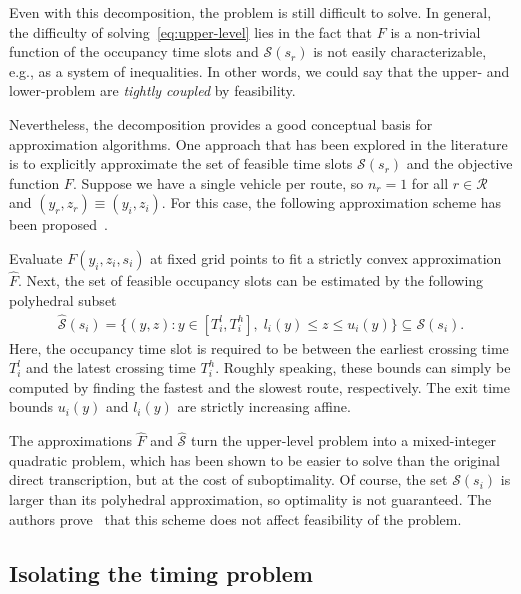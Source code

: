\documentclass[a4paper]{report}
\theoremstyle{definition}
\theoremstyle{plain}
\begin{document}
Even with this decomposition, the problem is still difficult to solve.
%
In general, the difficulty of solving~\eqref{eq:upper-level} lies in the fact that $F$ is a
non-trivial function of the occupancy time slots and $\mathcal{S}(s_{r})$ is not
easily characterizable, e.g., as a system of inequalities. In other words, we
could say that the upper- and lower-problem are \emph{tightly coupled} by
feasibility.

Nevertheless, the decomposition provides a good conceptual basis for
approximation algorithms.
%
One approach that has been explored in the literature is to explicitly
approximate the set of feasible time slots $\mathcal{S}(s_r)$ and the objective
function $F$.
%
Suppose we have a single vehicle per route, so $n_r = 1$ for all
$r \in \mathcal{R}$ and $(y_{r}, z_{r}) \equiv (y_{i},z_{i})$.
%
For this case, the following approximation scheme has been proposed~\cite{hultApproximateSolutionOptimal2015}. 

Evaluate $F(y_{i}, z_{i}, s_{i})$ at fixed grid points to fit a strictly convex approximation $\hat{F}$.
%
Next, the set of feasible occupancy slots can be estimated by the following
polyhedral subset
\begin{align}
  \hat{\mathcal{S}}(s_i) = \{ (y, z) : y \in [T_{i}^{l},T_{i}^{h}], \; l_{i}(y) \leq z \leq u_{i}(y) \} \subseteq \mathcal{S}(s_{i}) .
\end{align}
Here, the occupancy time slot is required to be between the earliest crossing time
$T_{i}^{l}$ and the latest crossing time $T_{i}^{h}$. Roughly speaking, these
bounds can simply be computed by finding the fastest and the slowest route,
respectively.
%
The exit time bounds $u_{i}(y)$ and $l_{i}(y)$ are strictly increasing affine.

The approximations $\hat{F}$ and $\hat{\mathcal{S}}$ turn the upper-level problem into a
mixed-integer quadratic problem, which has been shown to be easier to solve than
the original direct transcription, but at the cost of suboptimality. Of course,
the set $\mathcal{S}(s_i)$ is larger than its polyhedral approximation, so
optimality is not guaranteed.
%
The authors prove~\cite{hultTechnicalReportApproximate} that this
scheme does not affect feasibility of the problem.


\subsection{Isolating the timing problem}\label{sec:delay-minimization}
\end{document}
